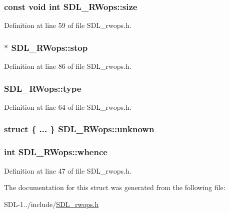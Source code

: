 \subsubsection[{size}]{\setlength{\rightskip}{0pt plus 5cm}const {\bf void} {\bf int} S\+D\+L\+\_\+\+R\+Wops\+::size}\label{struct_s_d_l___r_wops_a6c82c345afd893513c15b268f5bb4595}


Definition at line 59 of file S\+D\+L\+\_\+rwops.\+h.

\hypertarget{struct_s_d_l___r_wops_a4108a41afa8b62e75b0f160de4b56103}{}
\subsubsection[{stop}]{$\ast$ S\+D\+L\+\_\+\+R\+Wops\+::stop}\label{struct_s_d_l___r_wops_a4108a41afa8b62e75b0f160de4b56103}


Definition at line 86 of file S\+D\+L\+\_\+rwops.\+h.

\hypertarget{struct_s_d_l___r_wops_a099017bfceaac24ced0e4d08a4e0a023}{}
\subsubsection[{type}]{ S\+D\+L\+\_\+\+R\+Wops\+::type}\label{struct_s_d_l___r_wops_a099017bfceaac24ced0e4d08a4e0a023}


Definition at line 64 of file S\+D\+L\+\_\+rwops.\+h.

\hypertarget{struct_s_d_l___r_wops_a91be5f177f5d258abb085fbabc40a0b2}{}
\subsubsection[{unknown}]{\setlength{\rightskip}{0pt plus 5cm}struct \{ ... \}   S\+D\+L\+\_\+\+R\+Wops\+::unknown}\label{struct_s_d_l___r_wops_a91be5f177f5d258abb085fbabc40a0b2}
\hypertarget{struct_s_d_l___r_wops_a93eb5bc3cb33e22cc6c4e6362dcbe625}{}
\subsubsection[{whence}]{ {\bf int} S\+D\+L\+\_\+\+R\+Wops\+::whence}\label{struct_s_d_l___r_wops_a93eb5bc3cb33e22cc6c4e6362dcbe625}


Definition at line 47 of file S\+D\+L\+\_\+rwops.\+h.



The documentation for this struct was generated from the following file\+:\begin{DoxyCompactItemize}
\item 
S\+D\+L-\/1../include/\hyperlink{_s_d_l__rwops_8h}{S\+D\+L\+\_\+rwops.\+h}\end{DoxyCompactItemize}
